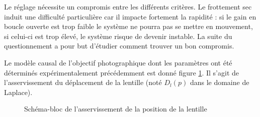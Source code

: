 Le réglage nécessite un compromis
entre les différents critères. Le frottement sec induit une difficulté
particulière car il impacte fortement la rapidité : si le gain en boucle
ouverte est trop faible le système ne pourra pas se mettre en mouvement,
si celui-ci est trop élevé, le système risque de devenir instable. La
suite du questionnement a pour but d'étudier comment trouver un bon
compromis.

Le modèle causal de l'objectif photographique dont les paramètres ont
été déterminés expérimentalement précédemment est donné figure \ref{fig14}. Il s'agit de l'asservissement du déplacement de la lentille (noté $D_l(p)$ dans le domaine de Laplace).

\begin{figure}[!htb]
\begin{center}
\begin{large}
\end{large}
\caption{Schéma-bloc de l'asservissement de la position de la lentille \label{fig14}}
\end{center}
\end{figure}




